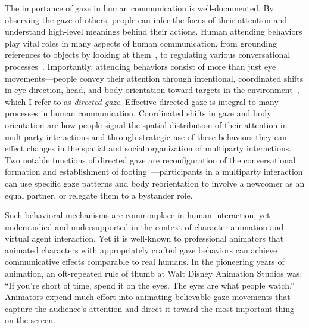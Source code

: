 The importance of gaze in human communication is well-documented. By observing the gaze of others, people can infer the focus of their attention and understand high-level meanings behind their actions. Human attending behaviors play vital roles in many aspects of human communication, from grounding references to objects by looking at them~\citep{hanna2007speakers,preissler2005role}, to regulating various conversational processes~\citep{kendon1990conducting,heylen2006head,mutlu2012conversational}. %
Importantly, attending behaviors consist of more than just eye movements---people convey their attention through intentional, coordinated shifts in eye direction, head, and body orientation toward targets in the environment~\citep{langton2000eyes}, which I refer to as \emph{directed gaze}.
Effective directed gaze is integral to many processes in human communication. Coordinated shifts in gaze and body orientation are how people signal the spatial distribution of their attention in multiparty interactions and through strategic use of these behaviors they can effect changes in the spatial and social organization of multiparty interactions. Two notable functions of directed gaze are reconfiguration of the conversational formation and establishment of footing~\citep{kendon1990conducting,mutlu2012conversational}---participants in a multiparty interaction can use specific gaze patterns and body reorientation to involve a newcomer as an equal partner, or relegate them to a bystander role.

Such behavioral mechanisms are commonplace in human interaction, yet understudied and undersupported in the context of character animation and virtual agent interaction. Yet it is well-known to professional animators that animated characters with appropriately crafted gaze behaviors can achieve communicative effects comparable to real humans. In the pioneering years of animation, an oft-repeated rule of thumb at Walt Disney Animation Studios was: ``If you're short of time, spend it on the eyes. The eyes are what people watch.''~\citep{thomas1981illusion} Animators expend much effort into animating believable gaze movements that capture the audience's attention and direct it toward the most important thing on the screen.

